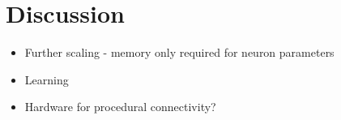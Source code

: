 \documentclass[9pt,twocolumn,twoside,lineno]{pnas-new}
\begin{document}
\section*{Discussion}
\begin{itemize}
    \item Further scaling - memory only required for neuron parameters
    \item Learning
    \item Hardware for procedural connectivity?
\end{itemize}
% 
% 
% 
% 
% 
% 
% 
% 
% 
\end{document}
